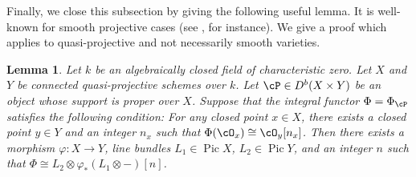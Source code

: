 \documentclass[12pt]{amsart}
\numberwithin{equation}{section}
\theoremstyle{plain}
\newtheorem{lemma}[theorem]{Lemma}
\theoremstyle{definition}
\DeclareMathOperator{\Pic}{\mathrm{Pic}}
\begin{document}
Finally, we close this subsection by giving the following useful lemma.
It is well-known for smooth projective cases (see {\cite[3.3]{MR3713877}}, for instance).
We give a proof which applies to quasi-projective and not necessarily smooth varieties.

\begin{lemma}\label{lem:criterion-to-be-standard-functor}
    Let $k$ be an algebraically closed field of characteristic zero.
    Let $X$ and $Y$ be connected quasi-projective schemes over $k$.
    Let $\cP \in D^b(X \times Y)$ be an object whose support is proper over $X$.
    Suppose that the integral functor $\Phi = \Phi_{\cP}$ satisfies the following condition: For any closed point $x \in X$, there exists a closed point $y \in Y$ and an integer $n_x$ such that $\Phi(\cO_x) \cong \cO_y[n_x]$.
    Then there exists a morphism $\varphi \colon X \to Y$, line bundles $L_1 \in \Pic X$, $L_2 \in \Pic Y$, and an integer $n$ such that $\Phi \cong L_2 \otimes \varphi_*(L_1 \otimes -)[n]$.
\end{lemma}
\end{document}
